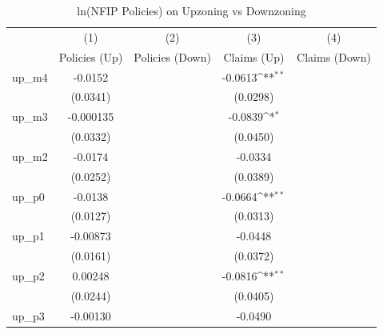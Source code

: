 \begin{table}[htbp]\centering
\def\sym#1{\ifmmode^{#1}\else\(^{#1}\)\fi}
\caption{ln(NFIP Policies) on Upzoning vs Downzoning}
\label{tab:insurance_updown}
\begin{tabular}{l*{4}{c}}
\hline\hline
                    &\multicolumn{1}{c}{(1)}&\multicolumn{1}{c}{(2)}&\multicolumn{1}{c}{(3)}&\multicolumn{1}{c}{(4)}\\
                    &\multicolumn{1}{c}{Policies (Up)}&\multicolumn{1}{c}{Policies (Down)}&\multicolumn{1}{c}{Claims (Up)}&\multicolumn{1}{c}{Claims (Down)}\\
\hline
up\_m4               &     -0.0152         &                     &     -0.0613\sym{**} &                     \\
                    &    (0.0341)         &                     &    (0.0298)         &                     \\
[0.15em]
up\_m3               &   -0.000135         &                     &     -0.0839\sym{*}  &                     \\
                    &    (0.0332)         &                     &    (0.0450)         &                     \\
[0.15em]
up\_m2               &     -0.0174         &                     &     -0.0334         &                     \\
                    &    (0.0252)         &                     &    (0.0389)         &                     \\
[0.15em]
up\_p0               &     -0.0138         &                     &     -0.0664\sym{**} &                     \\
                    &    (0.0127)         &                     &    (0.0313)         &                     \\
[0.15em]
up\_p1               &    -0.00873         &                     &     -0.0448         &                     \\
                    &    (0.0161)         &                     &    (0.0372)         &                     \\
[0.15em]
up\_p2               &     0.00248         &                     &     -0.0816\sym{**} &                     \\
                    &    (0.0244)         &                     &    (0.0405)         &                     \\
[0.15em]
up\_p3               &    -0.00130         &                     &     -0.0490         &                     \\

\end{tabular}
\end{table}
